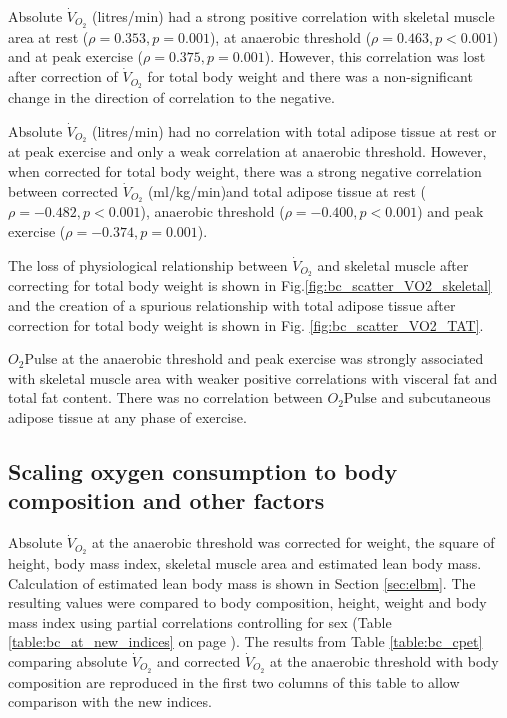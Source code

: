 Absolute $\dot{V}_{O_2}$ (litres/min) had a strong positive correlation with skeletal muscle area at rest ($\rho = 0.353, p = 0.001$), at anaerobic threshold ($\rho = 0.463, p<0.001$) and at peak exercise ($\rho = 0.375, p = 0.001$). 
However, this correlation was lost after correction of $\dot{V}_{O_2}$ for total body weight and there was a non-significant change in the direction of correlation to the negative.

Absolute $\dot{V}_{O_2}$ (litres/min) had no correlation with total adipose tissue at rest or at peak exercise and only a weak correlation at anaerobic threshold. 
However, when corrected for total body weight, there was a strong negative correlation between corrected $\dot{V}_{O_2}$ (ml/kg/min)and total adipose tissue at rest ($\rho = -0.482, p<0.001$), anaerobic threshold ($\rho = -0.400, p<0.001$) and peak exercise ($\rho = -0.374, p = 0.001$).

The loss of physiological relationship between $\dot{V}_{O_2}$ and skeletal muscle after correcting for total body weight is shown in Fig.\ref{fig:bc_scatter_VO2_skeletal} and the creation of a spurious relationship with total adipose tissue after correction for total body weight is shown in Fig. \ref{fig:bc_scatter_VO2_TAT}.

$O_2$Pulse at the anaerobic threshold and peak exercise was strongly associated with skeletal muscle area with weaker positive correlations with visceral fat and total fat content. 
There was no correlation between $O_2$Pulse and subcutaneous adipose tissue at any phase of exercise.


\subsection{Scaling oxygen consumption to body composition and other factors}
Absolute $\dot{V}_{O_2}$ at the anaerobic threshold was corrected for weight, the square of height, body mass index, skeletal muscle area and estimated lean body mass. Calculation of estimated lean body mass is shown in Section \ref{sec:elbm}.
The resulting values were compared to body composition, height, weight and body mass index using partial correlations controlling for sex (Table \ref{table:bc_at_new_indices} on page \pageref{table:bc_at_new_indices}). 
The results from Table \ref{table:bc_cpet} comparing absolute $\dot{V}_{O_2}$ and corrected $\dot{V}_{O_2}$ at the anaerobic threshold with body composition are reproduced in the first two columns of this table to allow comparison with the new indices. 

